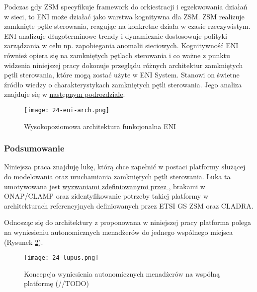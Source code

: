 Podczas gdy ZSM specyfikuje framework do orkiestracji i egzekwowania działań w sieci, to ENI może działać jako warstwa kognitywna dla ZSM. ZSM realizuje zamknięte pętle sterowania, reagując na konkretne działa w czasie rzeczywistym. ENI analizuje długoterminowe trendy i dynamicznie dostosowuje polityki zarządzania w celu np. zapobiegania anomalii sieciowych. Kognitywność ENI również opiera się na zamkniętych pętlach sterowania i co ważne z punktu widzenia niniejszej pracy \cite{etsieni2024} dokonuje przeglądu różnych architektur zamkniętych pętli sterowania, które mogą zostać użyte w ENI System. Stanowi on świetne źródło wiedzy o charakterystykach zamkniętych pętli sterowania. Jego analiza znajduje się w \hyperlink{sec:25}{następnym podrozdziale}.



\begin{figure}[!h]
    \centering \texttt{[image: 24-eni-arch.png]}
    \caption{Wysokopoziomowa architektura funkcjonalna ENI}\label{fig:24-eni-arch}
\end{figure}


\subsubsection{Podsumowanie}

Niniejsza praca znajduję lukę, którą chce zapełnić w postaci platformy służącej do modelowania oraz uruchamiania zamkniętych pętli sterowania. Luka ta umotywowana jest \hyperlink{list:1}{wyzwaniami zdefiniowanymi przez \cite{fallon2019}}, brakami w ONAP/CLAMP oraz zidentyfikowanie potrzeby takiej platformy w architekturach referencyjnych definiowanych przez ETSI GS ZSM oraz CLADRA.

Odnosząc się do architektury z \cite{kephart2003} proponowana w niniejszej pracy platforma polega na wyniesieniu autonomicznych menadżerów do jednego wspólnego miejsca (Rysunek \ref{fig:24-lupus}).

\begin{figure}[!htbp]
    \centering \texttt{[image: 24-lupus.png]}
    \caption{Koncepcja wyniesienia autonomicznych menadżerów na wspólną platformę (//TODO)}\label{fig:24-lupus}
\end{figure}